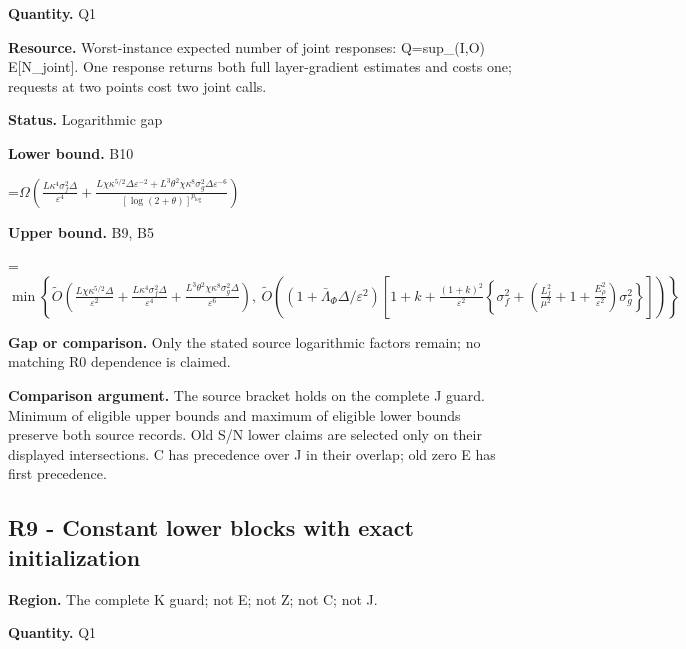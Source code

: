 \documentclass[10pt,a4paper]{article}
\newcommand{\AtlasMath}[1]{\par\begingroup\centering\setbox0=\hbox{$\displaystyle #1$}\ifdim\wd0>1.4\linewidth\typeout{ATLAS WIDE FORMULA: \the\wd0}\fi\ifdim\wd0>\linewidth\resizebox{\linewidth}{!}{\box0}\else\box0\fi\par\endgroup}
\begin{document}
\textbf{Quantity.} Q1



\textbf{Resource.} Worst-instance expected number of joint responses: Q=sup\_(I,O) E[N\_joint]. One response returns both full layer-gradient estimates and costs one; requests at two points cost two joint calls.



\textbf{Status.} Logarithmic gap



\textbf{Lower bound.} B10



\AtlasMath{\Omega\!\left(\frac{L\kappa^4\sigma_f^2\Delta}{\varepsilon^4}+\frac{L\chi\kappa^{5/2}\Delta\varepsilon^{-2}+L^3\theta^2\chi\kappa^8\sigma_g^2\Delta\varepsilon^{-6}}{[\log(2+\theta)]^{p_{\log}}}\right)}


\textbf{Upper bound.} B9, B5



\AtlasMath{\min\left\{\widetilde O\!\left(\frac{L\chi\kappa^{5/2}\Delta}{\varepsilon^2}+\frac{L\kappa^4\sigma_f^2\Delta}{\varepsilon^4}+\frac{L^3\theta^2\chi\kappa^8\sigma_g^2\Delta}{\varepsilon^6}\right),\ \widetilde O\!\left((1+\bar\Lambda_\Phi\Delta/\varepsilon^2)\left[1+k+\frac{(1+k)^2}{\varepsilon^2}\left\{\sigma_f^2+\left(\frac{L_f^2}{\mu^2}+1+\frac{E_\rho^2}{\varepsilon^2}\right)\sigma_g^2\right\}\right]\right)\right\}}


\textbf{Gap or comparison.} Only the stated source logarithmic factors remain; no matching R0 dependence is claimed.



\textbf{Comparison argument.} The source bracket holds on the complete J guard. Minimum of eligible upper bounds and maximum of eligible lower bounds preserve both source records. Old S/N lower claims are selected only on their displayed intersections. C has precedence over J in their overlap; old zero E has first precedence.



\subsection{R9 - Constant lower blocks with exact initialization}


\textbf{Region.} The complete K guard; not E; not Z; not C; not J.



\textbf{Quantity.} Q1
\end{document}
